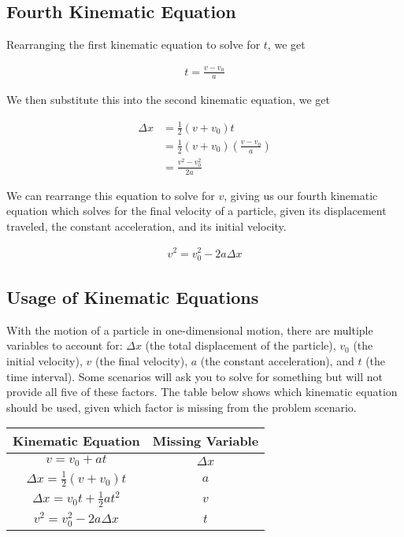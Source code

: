 \documentclass[11pt]{article}
\begin{document}
\subsection{Fourth Kinematic Equation}

Rearranging the first kinematic equation to solve for $t$, we get

\begin{align*}
    t = \frac{v - v_{0}}{a}
\end{align*}

We then substitute this into the second kinematic equation, we get

\begin{align*}
    \Delta x &= \frac{1}{2}(v + v_{0})t \\
             &= \frac{1}{2}(v + v_{0})\left(\frac{v - v_{0}}{a}\right) \\
             &= \frac{v^{2} - v_{0}^2}{2a}
\end{align*}

We can rearrange this equation to solve for $v$, giving us our fourth kinematic equation which solves for the final velocity of a particle, given its displacement traveled, the constant acceleration, and its initial velocity.

\begin{align*}
    v^{2} = v_{0}^{2} - 2a\Delta x
\end{align*}

\subsection{Usage of Kinematic Equations}

With the motion of a particle in one-dimensional motion, there are multiple variables to account for: $\Delta x$ (the total displacement of the particle), $v_{0}$ (the initial velocity), $v$ (the final velocity), $a$ (the constant acceleration), and $t$ (the time interval). Some scenarios will ask you to solve for something but will not provide all five of these factors. The table below shows which kinematic equation should be used, given which factor is missing from the problem scenario. 

\begin{table}[H]
    \centering
    \begin{tabular}{c|c}
        Kinematic Equation & Missing Variable \\
        \hline
        $v = v_{0} + at$ & $\Delta x$ \\
        $\Delta x = \frac{1}{2}(v + v_{0})t$ & $a$ \\
        $\Delta x = v_{0}t + \frac{1}{2}at^{2}$ & $v$ \\
        $v^{2} = v_{0}^{2} - 2a\Delta x$ & $t$ \\
    \end{tabular}
\end{table}
\end{document}
